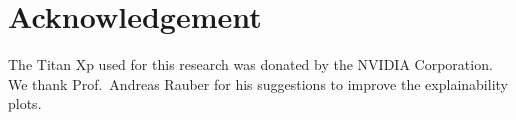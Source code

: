 \documentclass[10pt,sigconf,letterpaper,dvipsnames]{acmart}
\begin{document}
\section*{Acknowledgement}
The Titan Xp used for this research was donated by the NVIDIA Corporation. We thank Prof.~Andreas Rauber for his suggestions to improve the explainability plots.



%




%
%
\end{document}
